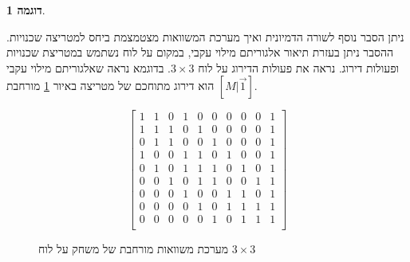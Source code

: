 \documentclass[12pt,leqno]{article}
\theoremstyle{theoremdd}
\newtheorem{example}{דוגמה}[section]
\begin{document}
\begin{example}
\end{example}


ניתן הסבר נוסף לשורה הדמיונית
ואיך
מערכת המשוואות מצטמצמת
ביחס למטריצה שכנויות.
ההסבר ניתן בעזרת תיאור אלגוריתם מילוי עקבי,
במקום על לוח נשתמש במטריצת שכנויות ופעולות דירוג.
נראה את פעולות הדירוג על לוח 
$3 \times 3$.
בדוגמא נראה 
שאלגוריתם מילוי עקבי הוא דירוג מתוחכם של מטריצה
באיור 
\ref{fig: full matrix 3 x 3}
מורחבת 
$[M | \vec{1}]$.

\begin{figure}[ht]
    \caption{
        מערכת משוואות מורחבת של משחק על לוח 
        $3 \times 3$
    }
    \label{fig: full matrix 3 x 3}
    \begin{english}
        \begin{center}
            \[\left[
            \begin{array}{ccccccccc|c}
                    1& 1& 0& 1& 0& 0& 0& 0& 0& 1 \\
                    1& 1& 1& 0& 1& 0& 0& 0& 0& 1 \\
                    0& 1& 1& 0& 0& 1& 0& 0& 0& 1 \\
                    1& 0& 0& 1& 1& 0& 1& 0& 0& 1 \\
                    0& 1& 0& 1& 1& 1& 0& 1& 0& 1 \\
                    0& 0& 1& 0& 1& 1& 0& 0& 1& 1 \\
                    0& 0& 0& 1& 0& 0& 1& 1& 0& 1 \\
                    0& 0& 0& 0& 1& 0& 1& 1& 1& 1 \\
                    0& 0& 0& 0& 0& 1& 0& 1& 1& 1 \\
            \end{array}
            \right]\]
        \end{center}
    \end{english}
\end{figure}
\end{document}
